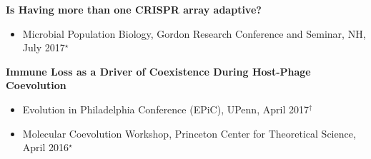 \documentclass[]{res}
\begin{document}
\begin{resume}
 {\bf Is Having more than one CRISPR array adaptive?}
 \begin{itemize}
 \item Microbial Population Biology, Gordon Research Conference and Seminar, NH, July 2017$^{\star}$
 \end{itemize}
 
  {\bf Immune Loss as a Driver of Coexistence During Host-Phage Coevolution}
 \begin{itemize}
 \item Evolution in Philadelphia Conference (EPiC), UPenn, April 2017$^{\dagger}$
 \item Molecular Coevolution Workshop, Princeton Center for Theoretical Science, April 2016$^{\star}$
 \end{itemize}


\end{resume} 
\end{document}
